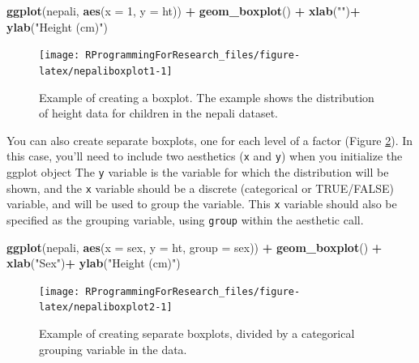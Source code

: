 \documentclass[]{book}
\makeatletter
\newenvironment{Shaded}{\begin{snugshade}}{\end{snugshade}}
\newcommand{\KeywordTok}[1]{\textcolor[rgb]{0.13,0.29,0.53}{\textbf{#1}}}
\newcommand{\DataTypeTok}[1]{\textcolor[rgb]{0.13,0.29,0.53}{#1}}
\newcommand{\DecValTok}[1]{\textcolor[rgb]{0.00,0.00,0.81}{#1}}
\newcommand{\StringTok}[1]{\textcolor[rgb]{0.31,0.60,0.02}{#1}}
\newcommand{\OperatorTok}[1]{\textcolor[rgb]{0.81,0.36,0.00}{\textbf{#1}}}
\newcommand{\NormalTok}[1]{#1}
\newenvironment{kframe}{%
\medskip{}
\setlength{\fboxsep}{.8em}
 \def\at@end@of@kframe{}%
 \ifinner\ifhmode%
  \def\at@end@of@kframe{\end{minipage}}%
  \begin{minipage}{\columnwidth}%
 \fi\fi%
 \def\FrameCommand##1{\hskip\@totalleftmargin \hskip-\fboxsep
 \colorbox{shadecolor}{##1}\hskip-\fboxsep
     \hskip-\linewidth \hskip-\@totalleftmargin \hskip\columnwidth}%
 \MakeFramed {\advance\hsize-\width
   \@totalleftmargin\z@ \linewidth\hsize
   \@setminipage}}%
 {\par\unskip\endMakeFramed%
 \at@end@of@kframe}
\renewenvironment{Shaded}{\begin{kframe}}{\end{kframe}}
\theoremstyle{definition}
\theoremstyle{definition}
\theoremstyle{definition}
\theoremstyle{remark}
\makeatother
\begin{document}
\begin{Shaded}
\begin{Highlighting}[]
\KeywordTok{ggplot}\NormalTok{(nepali, }\KeywordTok{aes}\NormalTok{(}\DataTypeTok{x =} \DecValTok{1}\NormalTok{, }\DataTypeTok{y =}\NormalTok{ ht)) }\OperatorTok{+}\StringTok{ }
\StringTok{  }\KeywordTok{geom_boxplot}\NormalTok{() }\OperatorTok{+}\StringTok{ }
\StringTok{  }\KeywordTok{xlab}\NormalTok{(}\StringTok{""}\NormalTok{)}\OperatorTok{+}\StringTok{ }\KeywordTok{ylab}\NormalTok{(}\StringTok{"Height (cm)"}\NormalTok{)}
\end{Highlighting}
\end{Shaded}

\begin{figure}

{\centering \texttt{[image: RProgrammingForResearch\_files/figure-latex/nepaliboxplot1-1]} 

}

\caption{Example of creating a boxplot. The example shows the distribution of height data for children in the nepali dataset.}\label{fig:nepaliboxplot1}
\end{figure}

You can also create separate boxplots, one for each level of a factor
(Figure \ref{fig:nepaliboxplot2}). In this case, you'll need to include
two aesthetics (\texttt{x} and \texttt{y}) when you initialize the
ggplot object The \texttt{y} variable is the variable for which the
distribution will be shown, and the \texttt{x} variable should be a
discrete (categorical or TRUE/FALSE) variable, and will be used to group
the variable. This \texttt{x} variable should also be specified as the
grouping variable, using \texttt{group} within the aesthetic call.

\begin{Shaded}
\begin{Highlighting}[]
\KeywordTok{ggplot}\NormalTok{(nepali, }\KeywordTok{aes}\NormalTok{(}\DataTypeTok{x =}\NormalTok{ sex, }\DataTypeTok{y =}\NormalTok{ ht, }\DataTypeTok{group =}\NormalTok{ sex)) }\OperatorTok{+}\StringTok{ }
\StringTok{  }\KeywordTok{geom_boxplot}\NormalTok{() }\OperatorTok{+}\StringTok{ }
\StringTok{  }\KeywordTok{xlab}\NormalTok{(}\StringTok{"Sex"}\NormalTok{)}\OperatorTok{+}\StringTok{ }\KeywordTok{ylab}\NormalTok{(}\StringTok{"Height (cm)"}\NormalTok{) }
\end{Highlighting}
\end{Shaded}

\begin{figure}

{\centering \texttt{[image: RProgrammingForResearch\_files/figure-latex/nepaliboxplot2-1]} 

}

\caption{Example of creating separate boxplots, divided by a categorical grouping variable in the data.}\label{fig:nepaliboxplot2}
\end{figure}
\end{document}
